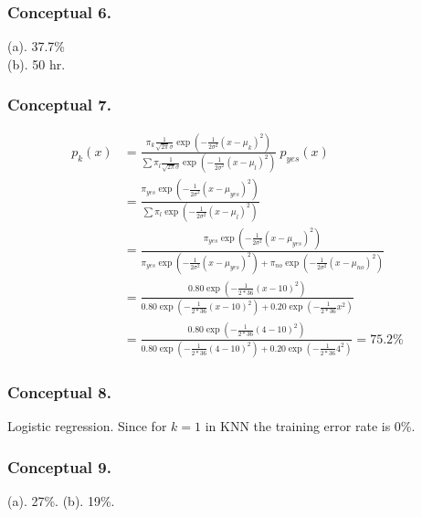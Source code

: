 \subsubsection{Conceptual 6.}
(a). 37.7\%\\
(b). 50 hr.
\subsubsection{Conceptual 7.}
\begin{align*}
p_k(x) &= \frac {\pi_k \frac {1} {\sqrt{2 \pi} \sigma} \exp(- \frac {1} {2 \sigma^2} (x - \mu_k)^2) } {\sum { \pi_l \frac {1} {\sqrt{2 \pi} \sigma} \exp(- \frac {1} {2 \sigma^2} (x - \mu_l)^2) }} \ p_{yes}(x) \\
&=  \frac {\pi_{yes} \exp(- \frac {1} {2 \sigma^2} (x - \mu_{yes})^2) } {\sum { \pi_l \exp(- \frac {1} {2 \sigma^2} (x - \mu_l)^2) }} \ \\
&= \frac {\pi_{yes} \exp(- \frac {1} {2 \sigma^2} (x - \mu_{yes})^2)} { \pi_{yes} \exp(- \frac {1} {2 \sigma^2} (x - \mu_{yes})^2) + \pi_{no} \exp(- \frac {1} {2 \sigma^2} (x - \mu_{no})^2) } \ \\
&= \frac {0.80 \exp(- \frac {1} {2 * 36} (x - 10)^2)} { 0.80 \exp(- \frac {1} {2 * 36} (x - 10)^2) + 0.20 \exp(- \frac {1} {2 * 36} x^2) }  \\
&= \frac {0.80 \exp(- \frac {1} {2 * 36} (4 - 10)^2)} { 0.80 \exp(- \frac {1} {2 * 36} (4 - 10)^2) + 0.20 \exp(- \frac {1} {2 * 36} 4^2) } = 75.2\%
\end{align*}
\subsubsection{Conceptual 8.}
Logistic regression. Since for $k=1$ in KNN the training error rate is 0\%.
\subsubsection{Conceptual 9.}
(a). 27\%.
(b). 19\%.

